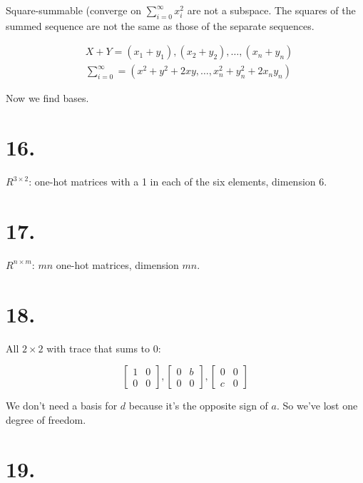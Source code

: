 \documentclass[]{article}
\begin{document}
Square-summable (converge on \(\sum^{\infty}_{i=0}x^2_i\) are not a
subspace. The squares of the summed sequence are not the same as those
of the separate sequences.

\[\begin{aligned}
&X +Y = (x_1+y_1), (x_2+y_2),\dots,(x_n+y_n)\\
&\sum^{\infty}_{i=0} = (x^2+y^2+2xy,\dots,x_n^2+y_n^2+2x_ny_n)\end{aligned}\]

Now we find bases.

\hypertarget{section-15}{%
\section{16.}\label{section-15}}

\(R^{3\times{2}}\): one-hot matrices with a 1 in each of the six
elements, dimension 6.

\hypertarget{section-16}{%
\section{17.}\label{section-16}}

\(R^{n \times {m}}\): \(mn\) one-hot matrices, dimension \(mn\).

\hypertarget{section-17}{%
\section{18.}\label{section-17}}

All \(2\times{2}\) with trace that sums to 0:

\[\begin{bmatrix}1&0\\
0&0\end{bmatrix},
\begin{bmatrix}0&b\\
0&0\end{bmatrix},
\begin{bmatrix}0&0\\
c&0\end{bmatrix}\]

We don't need a basis for \(d\) because it's the opposite sign of \(a\).
So we've lost one degree of freedom.

\hypertarget{section-18}{%
\section{19.}\label{section-18}}
\end{document}
